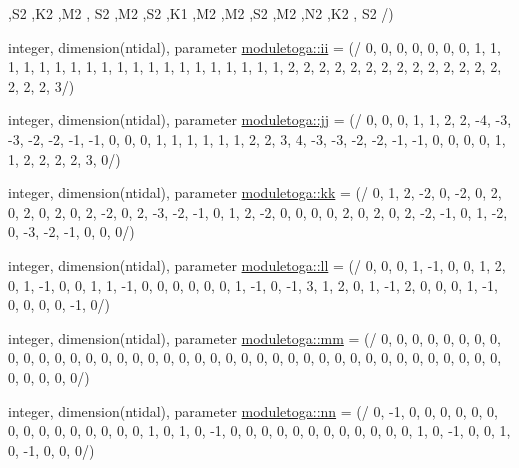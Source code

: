 \begin{DoxyCompactItemize}
\textquotesingle{},\textquotesingle{}S2 \textquotesingle{},\textquotesingle{}K2 \textquotesingle{},\textquotesingle{}M2 \textquotesingle{}, \textquotesingle{}S2 \textquotesingle{},\textquotesingle{}M2 \textquotesingle{},\textquotesingle{}S2 \textquotesingle{},\textquotesingle{}K1 \textquotesingle{},\textquotesingle{}M2 \textquotesingle{},\textquotesingle{}M2 \textquotesingle{},\textquotesingle{}S2 \textquotesingle{},\textquotesingle{}M2 \textquotesingle{},\textquotesingle{}N2 \textquotesingle{},\textquotesingle{}K2 \textquotesingle{}, \textquotesingle{}S2 \textquotesingle{}/)
\item 
integer, dimension(ntidal), parameter \mbox{\hyperlink{namespacemoduletoga_a0218336e96a9b01a78de8d432ce819a2}{moduletoga\+::ii}} = (/ 0, 0, 0, 0, 0, 0, 0, 1, 1, 1, 1, 1, 1, 1, 1, 1, 1, 1, 1, 1, 1, 1, 1, 1, 1, 1, 1, 2, 2, 2, 2, 2, 2, 2, 2, 2, 2, 2, 2, 2, 2, 2, 2, 2, 3/)
\item 
integer, dimension(ntidal), parameter \mbox{\hyperlink{namespacemoduletoga_aa9d388e57890548d613710d426c60d00}{moduletoga\+::jj}} = (/ 0, 0, 0, 1, 1, 2, 2, -\/4, -\/3, -\/3, -\/2, -\/2, -\/1, -\/1, 0, 0, 0, 1, 1, 1, 1, 1, 1, 2, 2, 3, 4, -\/3, -\/3, -\/2, -\/2, -\/1, -\/1, 0, 0, 0, 0, 1, 1, 2, 2, 2, 2, 3, 0/)
\item 
integer, dimension(ntidal), parameter \mbox{\hyperlink{namespacemoduletoga_ad26516df51749ac7f2fd2a972f1a6a26}{moduletoga\+::kk}} = (/ 0, 1, 2, -\/2, 0, -\/2, 0, 2, 0, 2, 0, 2, 0, 2, -\/2, 0, 2, -\/3, -\/2, -\/1, 0, 1, 2, -\/2, 0, 0, 0, 0, 2, 0, 2, 0, 2, -\/2, -\/1, 0, 1, -\/2, 0, -\/3, -\/2, -\/1, 0, 0, 0/)
\item 
integer, dimension(ntidal), parameter \mbox{\hyperlink{namespacemoduletoga_a2c0e244dff07733f78c917efe2bbbc82}{moduletoga\+::ll}} = (/ 0, 0, 0, 1, -\/1, 0, 0, 1, 2, 0, 1, -\/1, 0, 0, 1, 1, -\/1, 0, 0, 0, 0, 0, 0, 1, -\/1, 0, -\/1, 3, 1, 2, 0, 1, -\/1, 2, 0, 0, 0, 1, -\/1, 0, 0, 0, 0, -\/1, 0/)
\item 
integer, dimension(ntidal), parameter \mbox{\hyperlink{namespacemoduletoga_a3bf11793a5868095fc707ec57cb7eff0}{moduletoga\+::mm}} = (/ 0, 0, 0, 0, 0, 0, 0, 0, 0, 0, 0, 0, 0, 0, 0, 0, 0, 0, 0, 0, 0, 0, 0, 0, 0, 0, 0, 0, 0, 0, 0, 0, 0, 0, 0, 0, 0, 0, 0, 0, 0, 0, 0, 0, 0/)
\item 
integer, dimension(ntidal), parameter \mbox{\hyperlink{namespacemoduletoga_a81315410d16519be6056987f27dd8dd9}{moduletoga\+::nn}} = (/ 0, -\/1, 0, 0, 0, 0, 0, 0, 0, 0, 0, 0, 0, 0, 0, 0, 0, 1, 0, 1, 0, -\/1, 0, 0, 0, 0, 0, 0, 0, 0, 0, 0, 0, 0, 1, 0, -\/1, 0, 0, 1, 0, -\/1, 0, 0, 0/)
\item 

\end{DoxyCompactItemize}
